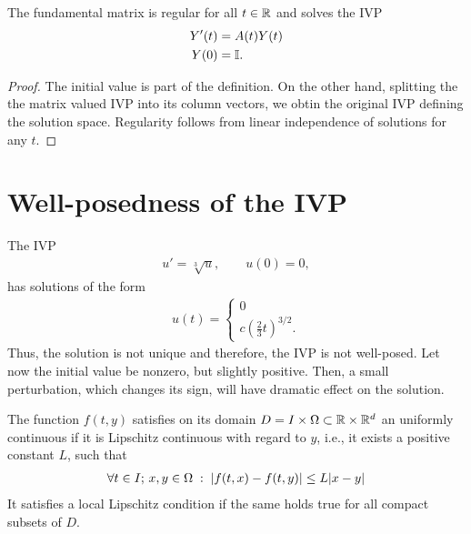 


\begin{corollary}
  The fundamental matrix is regular for all $t\in \mathbb R$ and solves the
  IVP
  \begin{align*}
    Y'(t) &= A(t)Y(t)\\
    Y (0) &= \mathbb I.
  \end{align*}
\end{corollary}

\begin{proof}
  The initial value is part of the definition. On the other hand,
  splitting the the matrix valued IVP into its column vectors, we
  obtin the original IVP defining the solution space. Regularity
  follows from linear independence of solutions for any $t$.
\end{proof}

\section{Well-posedness of the IVP}
\label{sec:awa:well-posedness}




\begin{example}
  The IVP
  \begin{gather*}
    u'= \sqrt[3]{u}, \qquad u(0) = 0,
  \end{gather*}
  has solutions of the form
  \begin{gather*}
    u(t) =
    \begin{cases}
      0 \\
      c \left(\tfrac23t\right)^{3/2}.
    \end{cases}
  \end{gather*}
  Thus, the solution is not unique and therefore, the IVP is not
  well-posed.
  Let now the initial value be nonzero, but slightly positive. Then, a small
  perturbation, which changes its sign, will have dramatic effect on
  the solution.
\end{example}

\begin{definition}
  The function $f(t,y)$ satisfies on its domain $D = I\times\Omega \subset
  \mathbb R \times \mathbb R^d$ an uniformly continuous  if 
	it is Lipschitz continuous with regard to $y$, i.e., it exists a 
	positive constant $L$, such that
  \begin{gather}
    \label{eq:awa:1}
    \forall t\in I;\,x,y\in\Omega \;:\;
    \lvert f(t,x)-f(t,y)\rvert \le L \lvert x-y\rvert
  \end{gather}
  It satisfies a local Lipschitz condition if the same holds true for all 
  compact subsets of $D$.
\end{definition}


